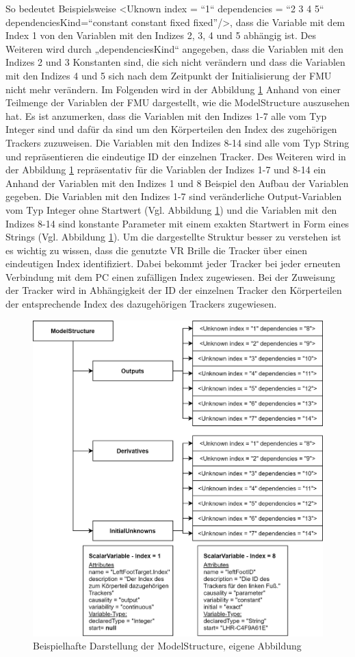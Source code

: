 So bedeutet Beispielsweise <Uknown index  = “1“ dependencies = “2 3 4 5“ dependenciesKind=“constant constant fixed fixed”/>, dass die Variable mit dem Index 1 von den Variablen mit den Indizes 2, 3, 4 und 5 abhängig ist. Des Weiteren wird durch „dependenciesKind“ angegeben, dass die Variablen mit den Indizes 2 und 3 Konstanten sind, die sich nicht verändern und dass die Variablen mit den Indizes 4 und 5 sich nach dem Zeitpunkt der Initialisierung der FMU nicht mehr verändern.
\newline\newline
Im Folgenden wird in der Abbildung \ref{fig:ModelStructure} Anhand von einer Teilmenge der Variablen der FMU dargestellt, wie die ModelStructure auszusehen hat. Es ist anzumerken, dass die Variablen mit den Indizes 1-7 alle vom Typ Integer sind und dafür da sind um den Körperteilen den Index des zugehörigen Trackers zuzuweisen. Die Variablen mit den Indizes 8-14 sind alle vom Typ String und repräsentieren die eindeutige ID der einzelnen Tracker. Des Weiteren wird in der Abbildung \ref{fig:ModelStructure} repräsentativ für die Variablen der Indizes 1-7 und 8-14 ein Anhand der Variablen mit den Indizes 1 und 8 Beispiel den Aufbau der Variablen gegeben. Die Variablen mit den Indizes 1-7 sind veränderliche Output-Variablen vom Typ Integer ohne Startwert (Vgl. Abbildung \ref{fig:ModelStructure}) und die Variablen mit den Indizes 8-14 sind konstante Parameter mit einem exakten Startwert in Form eines Strings (Vgl. Abbildung \ref{fig:ModelStructure}). Um die dargestellte Struktur besser zu verstehen ist es wichtig zu wissen, dass die genutzte VR Brille die Tracker über einen eindeutigen Index identifiziert. Dabei bekommt jeder Tracker bei jeder erneuten Verbindung mit dem PC einen zufälligen Index zugewiesen. Bei der Zuweisung der Tracker wird in Abhängigkeit der ID der einzelnen Tracker den Körperteilen der entsprechende Index des dazugehörigen Trackers zugewiesen.
\begin{figure}[h]
	\centering
	\includegraphics[width=0.85\linewidth]{Bilder/A31_ModelStructure}
	\caption{Beispielhafte Darstellung der ModelStructure, eigene Abbildung}
	\label{fig:ModelStructure}
\end{figure}
\newpage
